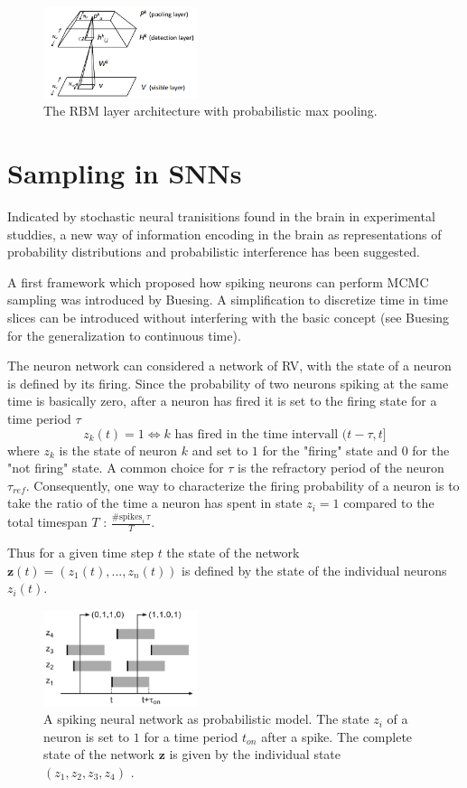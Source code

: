 \begin{figure}
	\centering
    	\includegraphics[width=0.4\textwidth]{imgs/prob_max_pool.png} 
    \caption{The RBM layer architecture with probabilistic max pooling.}
	\label{fig:probmaxpool}
\end{figure}


\section{Sampling in SNNs}

Indicated by stochastic neural tranisitions found in the brain in experimental studdies, a new way of information encoding in the brain as representations of probability distributions and probabilistic interference has been suggested.


A first framework which proposed how spiking neurons can perform MCMC sampling was introduced by Buesing.
A simplification to discretize time in time slices can be introduced without interfering with the basic concept (see Buesing for the generalization to continuous time).

The neuron network can considered a network of RV, with the state of a neuron is defined by its firing. 
Since the probability of two neurons spiking at the same time is basically zero, after a neuron has fired it is set to the firing state for a time period $\tau$
\[
z_k(t) = 1 \iff k \text{ has fired in the time intervall } (t - \tau , t ] 
\] 
where $z_k$ is the state of neuron $k$ and set to $1$ for the "firing" state and $0$ for the "not firing" state. A common choice for $\tau$ is the refractory period of the neuron $\tau_{ref}$.
Consequently, one way to characterize the firing probability of a neuron is to take the ratio of the time a neuron has spent in state $z_i=1$ compared to the total timespan $T$ : $\frac{\#\text{spikes}_i \, \tau}{ T }$.

Thus for a given time step $t$ the state of the network $\textbf{z}(t) = (z_1(t), ... ,z_n(t))$ is defined by the state of the individual neurons $z_i(t)$. 


\begin{figure}
	\centering
    	\includegraphics[width=0.4\textwidth]{imgs/snn_sample1.png} 
    \caption{A spiking neural network as probabilistic model. The state $z_i$ of a neuron is set to $1$ for a time period $t_{on}$ after a spike. The complete state of the network $\textbf{z}$ is given by the individual state $(z_1, z_2, z_3, z_4)$ .}
	\label{fig:snnsamp1}
\end{figure}

